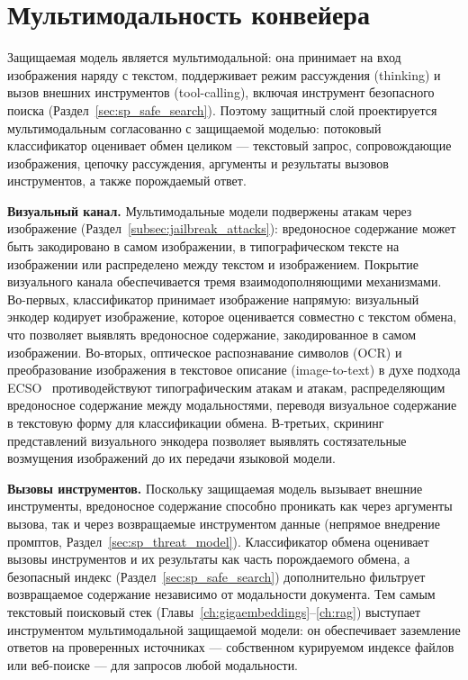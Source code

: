 \section{Мультимодальность конвейера}\label{sec:sp_multimodal}

Защищаемая модель является мультимодальной: она принимает на вход изображения наряду с текстом, поддерживает режим рассуждения (thinking) и вызов внешних инструментов (tool-calling), включая инструмент безопасного поиска (Раздел~\ref{sec:sp_safe_search}).
Поэтому защитный слой проектируется мультимодальным согласованно с защищаемой моделью: потоковый классификатор оценивает обмен целиком --- текстовый запрос, сопровождающие изображения, цепочку рассуждения, аргументы и результаты вызовов инструментов, а также порождаемый ответ.

\textbf{Визуальный канал.} Мультимодальные модели подвержены атакам через изображение (Раздел~\ref{subsec:jailbreak_attacks}): вредоносное содержание может быть закодировано в самом изображении, в типографическом тексте на изображении или распределено между текстом и изображением.
Покрытие визуального канала обеспечивается тремя взаимодополняющими механизмами.
Во-первых, классификатор принимает изображение напрямую: визуальный энкодер кодирует изображение, которое оценивается совместно с текстом обмена, что позволяет выявлять вредоносное содержание, закодированное в самом изображении.
Во-вторых, оптическое распознавание символов (OCR) и преобразование изображения в текстовое описание (image-to-text) в духе подхода ECSO~\cite{2403.09572} противодействуют типографическим атакам и атакам, распределяющим вредоносное содержание между модальностями, переводя визуальное содержание в текстовую форму для классификации обмена.
В-третьих, скрининг представлений визуального энкодера позволяет выявлять состязательные возмущения изображений до их передачи языковой модели.

\textbf{Вызовы инструментов.} Поскольку защищаемая модель вызывает внешние инструменты, вредоносное содержание способно проникать как через аргументы вызова, так и через возвращаемые инструментом данные (непрямое внедрение промптов, Раздел~\ref{sec:sp_threat_model}).
Классификатор обмена оценивает вызовы инструментов и их результаты как часть порождаемого обмена, а безопасный индекс (Раздел~\ref{sec:sp_safe_search}) дополнительно фильтрует возвращаемое содержание независимо от модальности документа.
Тем самым текстовый поисковый стек (Главы~\ref{ch:gigaembeddings}--\ref{ch:rag}) выступает инструментом мультимодальной защищаемой модели: он обеспечивает заземление ответов на проверенных источниках --- собственном курируемом индексе файлов или веб-поиске --- для запросов любой модальности.

